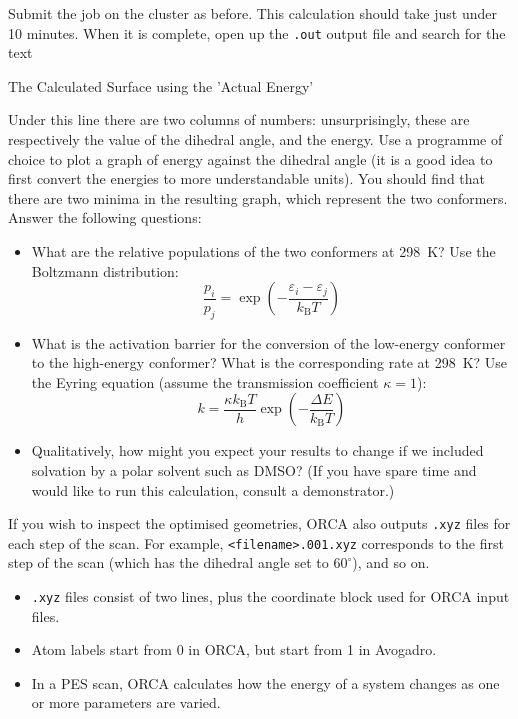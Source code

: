 \documentclass[10pt]{article}
\begin{document}
Submit the job on the cluster as before. This calculation should take just under 10 minutes. When it is complete, open up the \texttt{.out} output file and search for the text

\begin{cmdline}
The Calculated Surface using the 'Actual Energy'
\end{cmdline}

Under this line there are two columns of numbers: unsurprisingly, these are respectively the value of the dihedral angle, and the energy. Use a programme of choice to plot a graph of energy against the dihedral angle (it is a good idea to first convert the energies to more understandable units). You should find that there are two minima in the resulting graph, which represent the two conformers. Answer the following questions:

\begin{itemize}
    \item What are the relative populations of the two conformers at \SI{298}{K}? Use the Boltzmann distribution:
        \[ \frac{p_i}{p_j} = \exp\left(-\frac{\varepsilon_i - \varepsilon_j}{k_\mathrm{B}T}\right) \]
    \item What is the activation barrier for the conversion of the low-energy conformer to the high-energy conformer? What is the corresponding rate at \SI{298}{K}? Use the Eyring equation (assume the transmission coefficient \(\kappa = 1\)):
        \[ k = \frac{\kappa k_\mathrm{B}T}{h} \exp\left(-\frac{\Delta E}{k_\mathrm{B}T}\right) \]
    \item Qualitatively, how might you expect your results to change if we included solvation by a polar solvent such as DMSO? (If you have spare time and would like to run this calculation, consult a demonstrator.)
\end{itemize}

If you wish to inspect the optimised geometries, ORCA also outputs \texttt{.xyz} files for each step of the scan. For example, \texttt{<filename>.001.xyz} corresponds to the first step of the scan (which has the dihedral angle set to \(60^\circ\)), and so on.

\begin{summary}
    \begin{itemize}[leftmargin=0.6cm]
        \item \texttt{.xyz} files consist of two lines, plus the coordinate block used for ORCA input files.
        \item Atom labels start from 0 in ORCA, but start from 1 in Avogadro.
        \item In a PES scan, ORCA calculates how the energy of a system changes as one or more parameters are varied.
    \end{itemize}
\end{summary}
\end{document}
